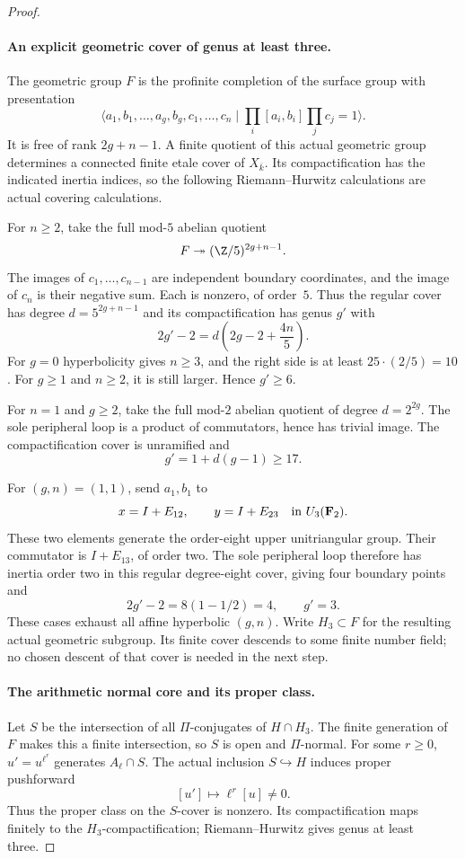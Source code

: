 \begin{proof}
\paragraph{An explicit geometric cover of genus at least three.}
The geometric group $F$ is the profinite completion of the
surface group with presentation
\[
 \langle a_1,b_1,\ldots,a_g,b_g,c_1,\ldots,c_n\mid
        \prod_i[a_i,b_i]\prod_jc_j=1\rangle .
\]
It is free of rank $2g+n-1$. A finite quotient of this
actual geometric group determines a connected finite
etale cover of $X_{\overline k}$. Its compactification
has the indicated inertia indices, so the following
Riemann--Hurwitz calculations are actual covering
calculations.

For $n\geq2$, take the full mod-$5$ abelian quotient
\[
        F\twoheadrightarrow(\Z/5)^{2g+n-1}.
\]
The images of $c_1,\ldots,c_{n-1}$ are independent
boundary coordinates, and the image of $c_n$ is their
negative sum. Each is nonzero, of order~$5$.
Thus the regular cover has degree $d=5^{2g+n-1}$ and
its compactification has genus $g'$ with
\[
       2g'-2=d\left(2g-2+\frac{4n}{5}\right).
                                                               \tag{GA.1}
\]
For $g=0$ hyperbolicity gives $n\geq3$, and the right
side is at least $25\cdot(2/5)=10$. For $g\geq1$
and $n\geq2$, it is still larger. Hence $g'\geq6$.

For $n=1$ and $g\geq2$, take the full mod-$2$
abelian quotient of degree $d=2^{2g}$. The sole
peripheral loop is a product of commutators, hence
has trivial image. The compactification cover is
unramified and
\[
                    g'=1+d(g-1)\geq17.                    \tag{GA.2}
\]

For $(g,n)=(1,1)$, send $a_1,b_1$ to
\[
 x=I+E_{12},\qquad y=I+E_{23}
                  \quad\hbox{in }U_3(\mathbf F_2).
\]
These two elements generate the order-eight upper
unitriangular group. Their commutator is
$I+E_{13}$, of order two. The sole peripheral
loop therefore has inertia order two in this
regular degree-eight cover, giving four boundary
points and
\[
                  2g'-2=8(1-1/2)=4,
                  \qquad g'=3.                            \tag{GA.3}
\]
These cases exhaust all affine hyperbolic $(g,n)$.
Write $H_3\subset F$ for the resulting actual
geometric subgroup. Its finite cover descends to
some finite number field; no chosen descent of
that cover is needed in the next step.

\paragraph{The arithmetic normal core and its proper class.}
Let $S$ be the intersection of all $\Pi$-conjugates
of $H\cap H_3$. The finite generation of $F$ makes
this a finite intersection, so $S$ is open and
$\Pi$-normal. For some $r\geq0$, $u'=u^{\ell^r}$
generates $A_\ell\cap S$. The actual inclusion
$S\hookrightarrow H$ induces proper pushforward
\[
              [u']\longmapsto\ell^r[u]\ne0.               \tag{GA.4}
\]
Thus the proper class on the $S$-cover is nonzero.
Its compactification maps finitely to the
$H_3$-compactification; Riemann--Hurwitz gives
genus at least three.


\end{proof}
